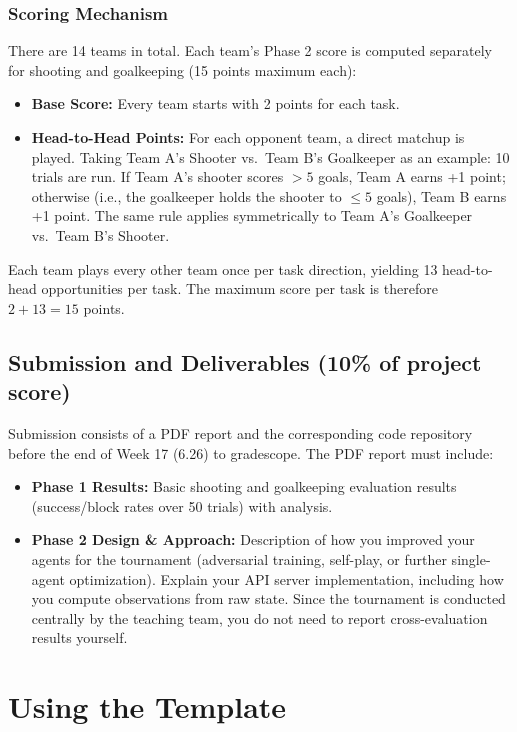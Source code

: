 \documentclass{article}
\begin{document}
\subsubsection{Scoring Mechanism}
There are 14 teams in total. Each team's Phase 2 score is computed separately for shooting and goalkeeping (15 points maximum each):

\begin{itemize}
    \item \textbf{Base Score:} Every team starts with 2 points for each task.
    \item \textbf{Head-to-Head Points:} For each opponent team, a direct matchup is played. Taking Team A's Shooter vs.\ Team B's Goalkeeper as an example: 10 trials are run. If Team A's shooter scores $>5$ goals, Team A earns +1 point; otherwise (i.e., the goalkeeper holds the shooter to $\le 5$ goals), Team B earns +1 point. The same rule applies symmetrically to Team A's Goalkeeper vs.\ Team B's Shooter.
\end{itemize}

Each team plays every other team once per task direction, yielding 13 head-to-head opportunities per task. The maximum score per task is therefore $2 + 13 = 15$ points.

\subsection{Submission and Deliverables (10\% of project score)}
Submission consists of a PDF report and the corresponding code repository before the end of Week 17 (6.26) to gradescope. The PDF report must include:
\begin{itemize}
    \item \textbf{Phase 1 Results:} Basic shooting and goalkeeping evaluation results (success/block rates over 50 trials) with analysis.
    \item \textbf{Phase 2 Design \& Approach:} Description of how you improved your agents for the tournament (adversarial training, self-play, or further single-agent optimization). Explain your API server implementation, including how you compute observations from raw state. Since the tournament is conducted centrally by the teaching team, you do not need to report cross-evaluation results yourself.
\end{itemize}


\section{Using the Template}
\end{document}
